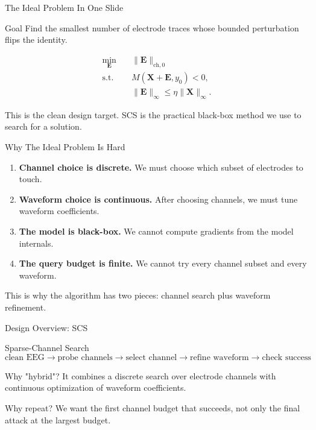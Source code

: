 \documentclass[aspectratio=169,11pt]{beamer}
\newcommand{\smallgap}{\vspace{0.45em}}
\begin{document}
\begin{frame}{The Ideal Problem In One Slide}
\begin{block}{Goal}
Find the smallest number of electrode traces whose bounded perturbation flips the identity.
\end{block}

\[
\begin{aligned}
\min_{\mathbf{E}} \quad
& \|\mathbf{E}\|_{\mathrm{ch},0}\\
\mathrm{s.t.}\quad
& M(\mathbf{X}+\mathbf{E},y_0)<0,\\
& \|\mathbf{E}\|_\infty\leq \eta\|\mathbf{X}\|_\infty.
\end{aligned}
\]

\begin{center}
\small This is the clean design target. SCS is the practical black-box method we use to search for a solution.
\end{center}
\end{frame}

\begin{frame}{Why The Ideal Problem Is Hard}
\begin{enumerate}
  \item \textbf{Channel choice is discrete.} We must choose which subset of electrodes to touch.
  \item \textbf{Waveform choice is continuous.} After choosing channels, we must tune waveform coefficients.
  \item \textbf{The model is black-box.} We cannot compute gradients from the model internals.
  \item \textbf{The query budget is finite.} We cannot try every channel subset and every waveform.
\end{enumerate}

\smallgap
\begin{center}
\alert{This is why the algorithm has two pieces: channel search plus waveform refinement.}
\end{center}
\end{frame}

\begin{frame}{Design Overview: SCS}
\begin{block}{Sparse-Channel Search}
\[
\text{clean EEG}
\rightarrow
\text{probe channels}
\rightarrow
\text{select channel}
\rightarrow
\text{refine waveform}
\rightarrow
\text{check success}
\]
\end{block}

\begin{block}{Why "hybrid"?}
It combines a discrete search over electrode channels with continuous optimization of waveform coefficients.
\end{block}

\begin{block}{Why repeat?}
We want the first channel budget that succeeds, not only the final attack at the largest budget.
\end{block}
\end{frame}
\end{document}
